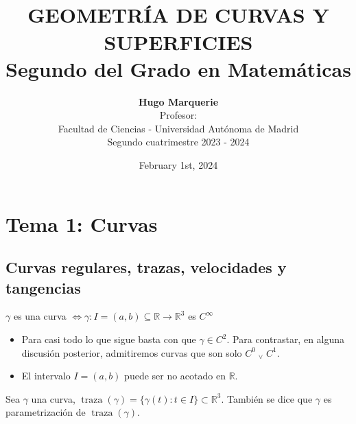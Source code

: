 \documentclass[12pt]{article}
\title{ \normalsize
		\HRule{0.06cm} \\ [0.5cm] %
		\LARGE \textbf{\uppercase{Geometría de curvas y superficies}
		\HRule{0.06cm} \\ \LARGE{Segundo del Grado en Matemáticas} \vspace*{10\baselineskip}}
		}
\date{February 1st, 2024}
\author{\textbf{Hugo Marquerie} \\ 
		Profesor: \\
		Facultad de Ciencias - Universidad Autónoma de Madrid \\
		Segundo cuatrimestre 2023 - 2024}
\theoremstyle{plain}
\newcommand{\R}{\mathbb{R}}
\newcommand{\appl}[3]{#1 \colon #2 \longrightarrow #3}
\newcommand{\ve}{\; _{\vee} \;}
\newcommand{\trz}[1]{\operatorname{traza}\left(#1\right)}
\begin{document}
\onehalfspacing
\setlength{\abovedisplayskip}{0.15cm}
\setlength{\belowdisplayskip}{0.25cm}
  
\maketitle
\thispagestyle{empty}
\clearpage
{} 

\section{Tema 1: Curvas}

\subsection{Curvas regulares, trazas, velocidades y tangencias}
\begin{defn}[Curva]
    $\gamma$ es una curva $\iff \appl{\gamma}{I=(a,b)\subseteq\R}{\R^3}$ es $C^{\infty}$
    \begin{itemize}
        \item Para casi todo lo que sigue basta con que $\gamma \in C^2$. Para contrastar, en alguna discusión posterior, admitiremos curvas que son solo $C^0 \ve C^1$.
        \item El intervalo $I = (a,b)$ puede ser no acotado en $\R$.
    \end{itemize}
\end{defn}
\begin{defn}[Traza]
    Sea $\gamma$ una curva, $\trz{\gamma}=\{\gamma(t):t\in I\}\subset \R^3$. También se dice que $\gamma$ es parametrización de $\trz{\gamma}$.
\end{defn}
\end{document}
